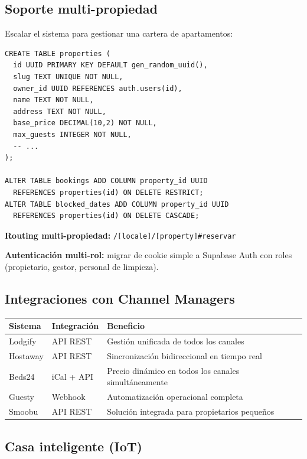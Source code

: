 \documentclass[12pt,a4paper,twoside,openright]{report}
\begin{document}
\subsection{Soporte multi-propiedad}

Escalar el sistema para gestionar una cartera de apartamentos:

\begin{lstlisting}[style=sqlStyle]
CREATE TABLE properties (
  id UUID PRIMARY KEY DEFAULT gen_random_uuid(),
  slug TEXT UNIQUE NOT NULL,
  owner_id UUID REFERENCES auth.users(id),
  name TEXT NOT NULL,
  address TEXT NOT NULL,
  base_price DECIMAL(10,2) NOT NULL,
  max_guests INTEGER NOT NULL,
  -- ...
);

ALTER TABLE bookings ADD COLUMN property_id UUID
  REFERENCES properties(id) ON DELETE RESTRICT;
ALTER TABLE blocked_dates ADD COLUMN property_id UUID
  REFERENCES properties(id) ON DELETE CASCADE;
\end{lstlisting}

\textbf{Routing multi-propiedad:} \texttt{/[locale]/[property]\#reservar}

\textbf{Autenticación multi-rol:} migrar de cookie simple a Supabase Auth con roles
(propietario, gestor, personal de limpieza).

\subsection{Integraciones con Channel Managers}

\begin{longtable}{L{3cm} L{3cm} L{7cm}}
  \toprule
  \textbf{Sistema} & \textbf{Integración} & \textbf{Beneficio} \\
  \midrule
  Lodgify & API REST & Gestión unificada de todos los canales \\
  Hostaway & API REST & Sincronización bidireccional en tiempo real \\
  Beds24 & iCal + API & Precio dinámico en todos los canales simultáneamente \\
  Guesty & Webhook & Automatización operacional completa \\
  Smoobu & API REST & Solución integrada para propietarios pequeños \\
  \bottomrule
\end{longtable}

\subsection{Casa inteligente (IoT)}
\end{document}
